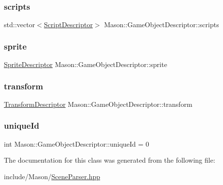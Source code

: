 \hypertarget{class_mason_1_1_game_object_descriptor_a07c8b975f3306740060a73924c6315a7}{}\label{class_mason_1_1_game_object_descriptor_a07c8b975f3306740060a73924c6315a7} 
\subsubsection{\texorpdfstring{scripts}{scripts}}
{\footnotesize\ttfamily std\+::vector$<$\hyperlink{class_mason_1_1_script_descriptor}{Script\+Descriptor}$>$ Mason\+::\+Game\+Object\+Descriptor\+::scripts}

\hypertarget{class_mason_1_1_game_object_descriptor_aa7e89568fa330d9337093a73b63f2d3e}{}\label{class_mason_1_1_game_object_descriptor_aa7e89568fa330d9337093a73b63f2d3e} 
\subsubsection{\texorpdfstring{sprite}{sprite}}
{\footnotesize\ttfamily \hyperlink{class_mason_1_1_sprite_descriptor}{Sprite\+Descriptor} Mason\+::\+Game\+Object\+Descriptor\+::sprite}

\hypertarget{class_mason_1_1_game_object_descriptor_aa22b35eef207a8451a3ad6b816ecd5ac}{}\label{class_mason_1_1_game_object_descriptor_aa22b35eef207a8451a3ad6b816ecd5ac} 
\subsubsection{\texorpdfstring{transform}{transform}}
{\footnotesize\ttfamily \hyperlink{class_mason_1_1_transform_descriptor}{Transform\+Descriptor} Mason\+::\+Game\+Object\+Descriptor\+::transform}

\hypertarget{class_mason_1_1_game_object_descriptor_aafbd17cd506939c46ce70b550762e2d1}{}\label{class_mason_1_1_game_object_descriptor_aafbd17cd506939c46ce70b550762e2d1} 
\subsubsection{\texorpdfstring{unique\+Id}{uniqueId}}
{\footnotesize\ttfamily int Mason\+::\+Game\+Object\+Descriptor\+::unique\+Id = 0}



The documentation for this class was generated from the following file\+:\begin{DoxyCompactItemize}
\item 
include/\+Mason/\hyperlink{_scene_parser_8hpp}{Scene\+Parser.\+hpp}\end{DoxyCompactItemize}
